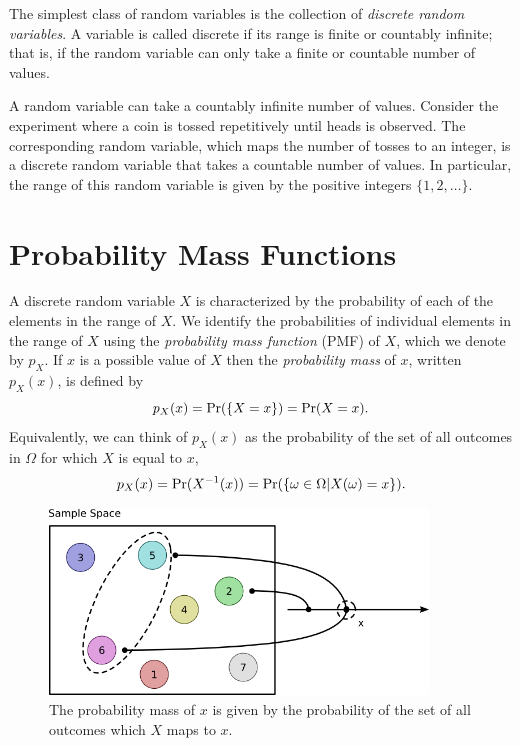 The simplest class of random variables is the collection of \emph{discrete random variables}.
A variable is called discrete if its range is finite or countably infinite; that is, if the random variable can only take a finite or countable number of values.

\begin{example}
A random variable can take a countably infinite number of values.
Consider the experiment where a coin is tossed repetitively until heads is observed.
The corresponding random variable, which maps the number of tosses to an integer, is a discrete random variable that takes a countable number of values.
In particular, the range of this random variable is given by the positive integers $\{1, 2, \ldots \}$.
\end{example}

\section{Probability Mass Functions}

A discrete random variable $X$ is characterized by the probability of each of the elements in the range of $X$.
We identify the probabilities of individual elements in the range of $X$ using the \emph{probability mass function} (PMF) of $X$, which we denote by $p_X$.
If $x$ is a possible value of $X$ then the \emph{probability mass} of $x$, written $p_X (x)$, is defined by
\begin{equation} \label{equation:PMF}
p_X (x) = \Pr ( \{ X = x \} ) = \Pr ( X = x ) .
\end{equation}
Equivalently, we can think of $p_X (x)$ as the probability of the set of all outcomes in $\Omega$ for which $X$ is equal to $x$,
\begin{equation*}
p_X (x)
= \Pr (  X^{-1} (x)  )
= \Pr ( \{ \omega \in \Omega | X(\omega) = x \} ) .
\end{equation*}

\begin{figure}[ht]
\begin{center}
\includegraphics[height=4.92cm]{Figures/5Chapter/pmf}
\caption{The probability mass of $x$ is given by the probability of the set of all outcomes which $X$ maps to $x$.}
\end{center}
\end{figure}


